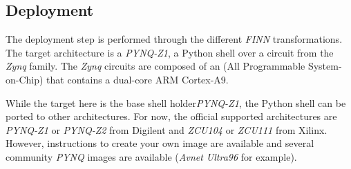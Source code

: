 
\subsection{Deployment}

The deployment step is performed through the different \emph{FINN} transformations. The target architecture is a \emph{PYNQ-Z1}, a Python shell over a circuit from the \emph{Zynq} family. The \emph{Zynq} circuits are composed of an  (All Programmable System-on-Chip) that contains a dual-core ARM Cortex-A9.

While the target here is the base shell holder\emph{PYNQ-Z1}, the Python shell can be ported to other architectures. For now, the official supported architectures are \emph{PYNQ-Z1} or \emph{PYNQ-Z2} from Digilent and \emph{ZCU104} or \emph{ZCU111} from Xilinx. However, instructions to create your own image are available and several community \emph{PYNQ} images are available (\emph{Avnet Ultra96} for example).
